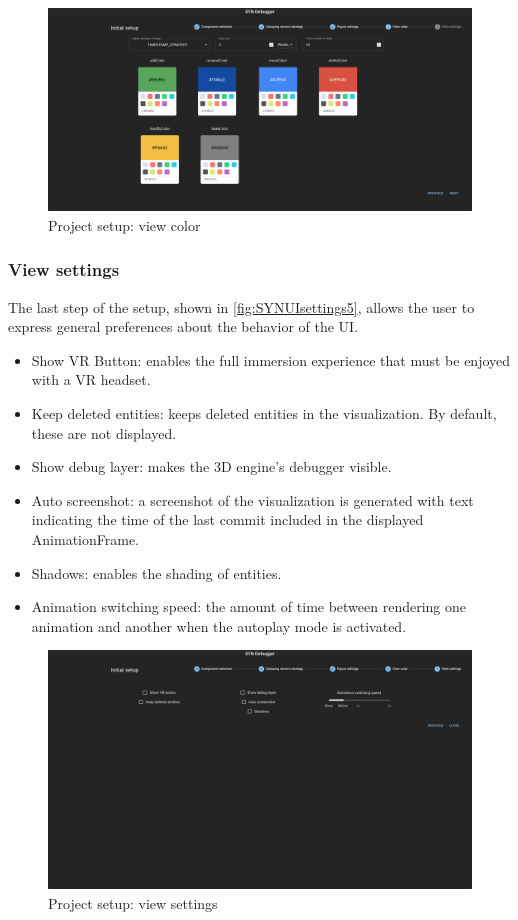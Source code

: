 \begin{figure}
    \center
    \includegraphics[width=\textwidth]{SYNUI-settings4.png}
    \caption{Project setup: view color}
    \label{fig:SYNUIsettings4}
\end{figure}

\subsubsection*{View settings}
The last step of the setup, shown in \autoref{fig:SYNUIsettings5}, allows the user to express general preferences about the behavior of the UI.

\begin{itemize}
    \item Show VR Button: enables the full immersion experience that must be enjoyed with a VR headset. 
    \item Keep deleted entities: keeps deleted entities in the visualization. By default, these are not displayed. 
    \item Show debug layer: makes the 3D engine's debugger visible. 
    \item Auto screenshot: a screenshot of the visualization is generated with text indicating the time of the last commit included in the displayed AnimationFrame.
    \item Shadows: enables the shading of entities. 
    \item Animation switching speed: the amount of time between rendering one animation and another when the autoplay mode is activated. 
\end{itemize}

\begin{figure}
    \center
    \includegraphics[width=\textwidth]{SYNUI-settings5.png}
    \caption{Project setup: view settings}
    \label{fig:SYNUIsettings5}
\end{figure}

